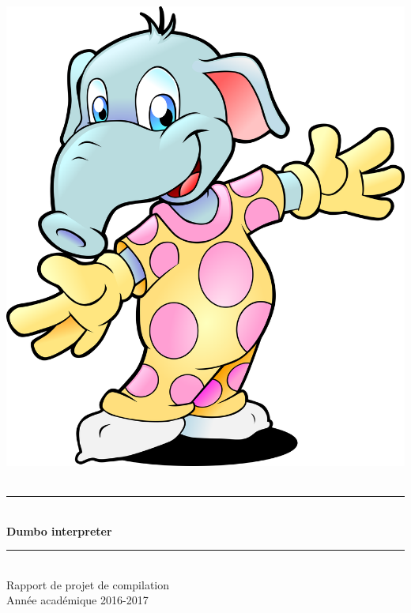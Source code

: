 \documentclass[10pt,a4paper]{article}
\newcommand{\HRule}{\rule{\linewidth}{0.5mm}}
\begin{document}
	\pagestyle{fancy}
	\fancyhf{}
	\cfoot{\thepage}
	
	\begin{titlepage}
		\begin{sffamily}
			\begin{center}
				\includegraphics[scale=0.25]{images/elephant.png}~\\[1.5cm]
				
				\HRule \\[0.5cm]
				{ \huge \bfseries Dumbo interpreter\\[0.4cm] }
				\HRule \\[1.5cm]
				
				\Large{Rapport de projet de compilation}\\[2cm]
				
				\Large{Année académique 2016-2017}\\[2cm]
				

\end{center}
\end{sffamily}
\end{titlepage}
\end{document}
